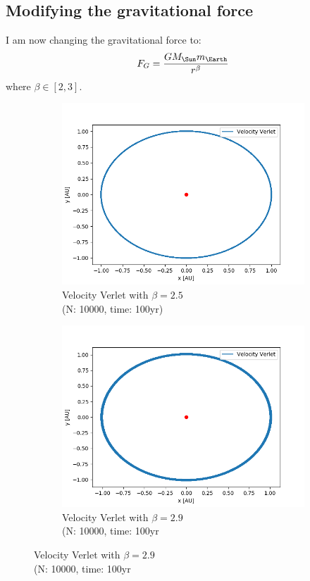 \documentclass{article}
\begin{document}
\subsection*{Modifying the gravitational force}
I am now changing the gravitational force to:
\begin{align*}
  F_G &= \frac{GM_{\Sun}m_{\Earth}}{r^{\beta}}\\
\end{align*}
where $\beta \in \left[2,3\right]$.
\begin{figure}[H]
  \centering
  \begin{subfigure}{0.5\textwidth}
    \centering
    \includegraphics[width=1.0\textwidth]{plots/beta_2p5.png}
    \caption{Velocity Verlet with $\beta =2.5$ \\(N: 10000, time: 100yr)}
  \end{subfigure}%
  \begin{subfigure}{0.5\textwidth}
    \centering
    \includegraphics[width=1.0\textwidth]{plots/beta_2p9.png}
    \caption{Velocity Verlet with $\beta =2.9$ \\(N: 10000, time: 100yr}  
  \end{subfigure}
\end{figure}
\end{document}
